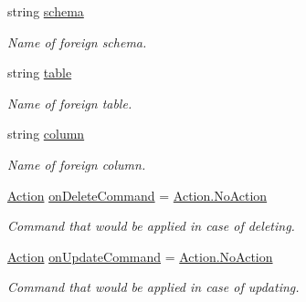 \begin{DoxyCompactItemize}
\item 
string \mbox{\hyperlink{class_uniform_data_operator_1_1_sql_1_1_attributes_1_1_is_foreign_key_a3adbb93b1e9ebb988b6fabf24e10991e}{schema}}
\begin{DoxyCompactList}\small\item\em Name of foreign schema. \end{DoxyCompactList}\item 
string \mbox{\hyperlink{class_uniform_data_operator_1_1_sql_1_1_attributes_1_1_is_foreign_key_ac480fc5f3f8ff86e0bb5877bab793e19}{table}}
\begin{DoxyCompactList}\small\item\em Name of foreign table. \end{DoxyCompactList}\item 
string \mbox{\hyperlink{class_uniform_data_operator_1_1_sql_1_1_attributes_1_1_is_foreign_key_a8d14eef86991a9e1a187876626cbb70b}{column}}
\begin{DoxyCompactList}\small\item\em Name of foreign column. \end{DoxyCompactList}\item 
\mbox{\hyperlink{class_uniform_data_operator_1_1_sql_1_1_attributes_1_1_is_foreign_key_a6039622384e2bbd1aa386e326ee0f850}{Action}} \mbox{\hyperlink{class_uniform_data_operator_1_1_sql_1_1_attributes_1_1_is_foreign_key_af70b31f4805f136d6a32b1fa33d9bbf6}{on\+Delete\+Command}} = \mbox{\hyperlink{class_uniform_data_operator_1_1_sql_1_1_attributes_1_1_is_foreign_key_a6039622384e2bbd1aa386e326ee0f850a1e601ea653db1c729c9ee5746730fabe}{Action.\+No\+Action}}
\begin{DoxyCompactList}\small\item\em Command that would be applied in case of deleting. \end{DoxyCompactList}\item 
\mbox{\hyperlink{class_uniform_data_operator_1_1_sql_1_1_attributes_1_1_is_foreign_key_a6039622384e2bbd1aa386e326ee0f850}{Action}} \mbox{\hyperlink{class_uniform_data_operator_1_1_sql_1_1_attributes_1_1_is_foreign_key_a3a45eb5c4419a10aafcc097c227bb794}{on\+Update\+Command}} = \mbox{\hyperlink{class_uniform_data_operator_1_1_sql_1_1_attributes_1_1_is_foreign_key_a6039622384e2bbd1aa386e326ee0f850a1e601ea653db1c729c9ee5746730fabe}{Action.\+No\+Action}}
\begin{DoxyCompactList}\small\item\em Command that would be applied in case of updating. \end{DoxyCompactList}\end{DoxyCompactItemize}


